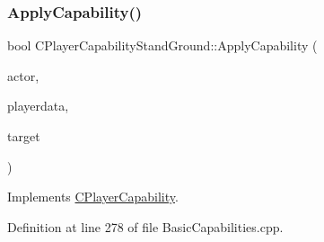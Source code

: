 \subsubsection{\texorpdfstring{Apply\+Capability()}{ApplyCapability()}}
{\footnotesize\ttfamily bool C\+Player\+Capability\+Stand\+Ground\+::\+Apply\+Capability (\begin{DoxyParamCaption}\item[{std\+::shared\+\_\+ptr$<$ \hyperlink{classCPlayerAsset}{C\+Player\+Asset} $>$}]{actor,  }\item[{std\+::shared\+\_\+ptr$<$ \hyperlink{classCPlayerData}{C\+Player\+Data} $>$}]{playerdata,  }\item[{std\+::shared\+\_\+ptr$<$ \hyperlink{classCPlayerAsset}{C\+Player\+Asset} $>$}]{target }\end{DoxyParamCaption})\hspace{0.3cm}{\ttfamily [virtual]}}



Implements \hyperlink{classCPlayerCapability_a2ca6fd7fbd9c0178f1cf1d049c63825f}{C\+Player\+Capability}.



Definition at line 278 of file Basic\+Capabilities.\+cpp.


